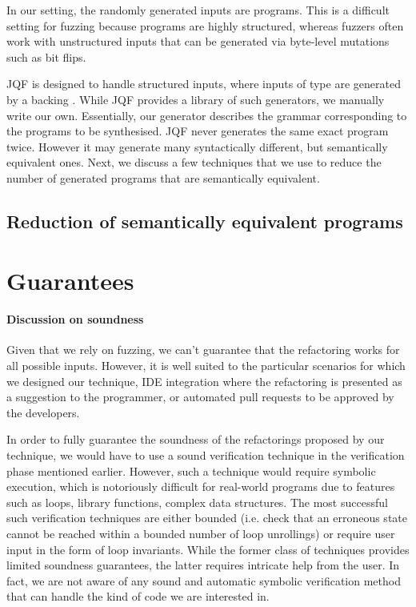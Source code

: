 \documentclass[runningheads,a4paper]{llncs}
\begin{document}
In our setting, the randomly generated inputs are programs.
This is a difficult setting for fuzzing because programs are
highly structured, whereas fuzzers often work with unstructured inputs
that can be generated via byte-level mutations such as bit flips.

JQF is designed to handle structured inputs, where inputs of type 
are generated by a backing .
While JQF provides a library of such generators, we manually write our own.
Essentially, our generator describes the grammar corresponding to the
programs to be synthesised.
JQF never generates the same exact program twice. However it may generate many
syntactically different, but semantically equivalent ones.
Next, we discuss a few techniques that we use to reduce the number of
generated programs that are semantically equivalent.

\subsection{Reduction of semantically equivalent programs}

\section{Guarantees}

\paragraph{Discussion on soundness} Given that we rely on fuzzing, we can't guarantee that the
refactoring works for all possible inputs. However, it is well suited
to the particular scenarios for which we designed our technique,
IDE integration where the refactoring is presented as a suggestion to the programmer,
or automated pull requests to be approved by the developers.

In order to fully guarantee the soundness of the refactorings proposed
by our technique, we would have to use a sound verification technique
in the verification phase mentioned earlier. However, such a technique
would require symbolic execution, which is notoriously difficult for
real-world programs due to features such as loops, library functions,
complex data structures. The most successful such verification
techniques are either bounded (i.e. check that an erroneous state
cannot be reached within a bounded number of loop unrollings) or
require user input in the form of loop invariants. While the former
class of techniques provides limited soundness guarantees, the latter
requires intricate help from the user.  In fact, we are not aware of
any sound and automatic symbolic verification method that can handle
the kind of code we are interested in.
\end{document}
